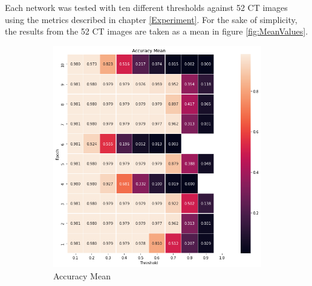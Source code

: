 Each network was tested with ten different thresholds against 52 CT images using the metrics described in chapter \ref{Experiment}. For the sake of simplicity, the results from the 52 CT images are taken as a mean in figure \ref{fig:MeanValues}.
\begin{figure}
        \centering
        \begin{subfigure}[b]{0.475\textwidth}
            \centering
            \includegraphics[width=\textwidth]{PICs/accuracy_mean.png}
            \caption[Accuracy Mean]%
            {{\small Accuracy Mean}}    
            \label{fig:acMean}
        \end{subfigure}
        \hfill
        \begin{subfigure}[b]{0.475\textwidth}  
            \centering 

\end{subfigure}
\end{figure}
